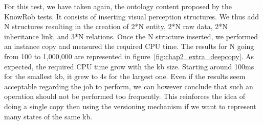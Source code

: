 For this test, we have taken again, the ontology content proposed by the KnowRob tests. It consists of inserting visual perception structures. We thus add N structures resulting in the creation of 2*N entity, 2*N raw data, 2*N inheritance link, and 3*N relations. Once the N structure inserted, we performed an instance copy and measured the required CPU time. The results for N going from 100 to 1,000,000 are represented in figure~\ref{fig:chap2_extra_deepcopy}. As expected, the required CPU time grow with the \acrshort{kb} size. Starting around 100ms for the smallest \acrshort{kb}, it grew to 4s for the largest one. Even if the results seem acceptable regarding the job to perform, we can however conclude that such an operation should not be performed too frequently. This reinforces the idea of doing a single copy then using the versioning mechanism if we want to represent many states of the same \acrshort{kb}.